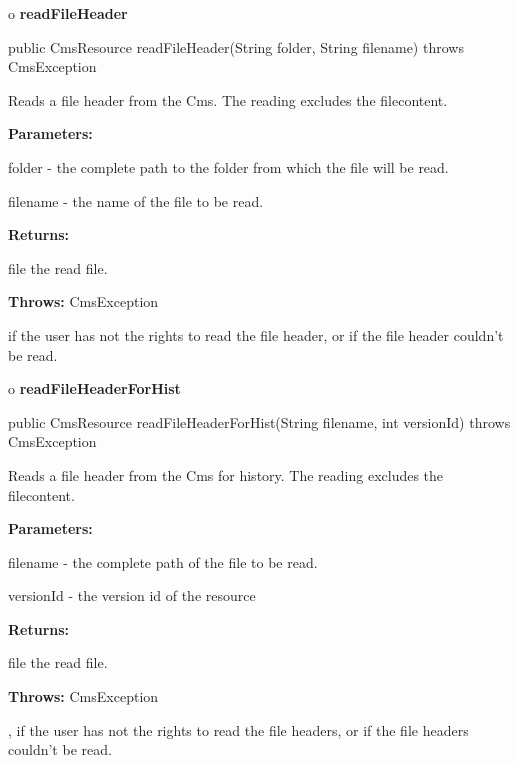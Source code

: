 o {\bf readFileHeader} 

\begin{PRE}
 public CmsResource readFileHeader(String folder,
                                   String filename) throws CmsException
\end{PRE}

\begin{description}
\htmlDD Reads a file header from the Cms. \htmlBR
The reading excludes the filecontent. 

\begin{description}
\item {\bf Parameters:}  

folder - the complete path to the folder from which the file will be read.  

filename - the name of the file to be read.  
\item {\bf Returns:}  

file the read file.  
\item {\bf Throws:} CmsException  

if the user has not the rights to read the file header, or if the file header
couldn't be read.  
\end{description}

\end{description}

o {\bf readFileHeaderForHist} 

\begin{PRE}
 public CmsResource readFileHeaderForHist(String filename,
                                          int versionId) throws CmsException
\end{PRE}

\begin{description}
\htmlDD Reads a file header from the Cms for history. \htmlBR
The reading excludes the filecontent. 

\begin{description}
\item {\bf Parameters:}  

filename - the complete path of the file to be read.  

versionId - the version id of the resource  
\item {\bf Returns:}  

file the read file.  
\item {\bf Throws:} CmsException  

, if the user has not the rights to read the file headers, or if the file
headers couldn't be read.  
\end{description}

\end{description}

